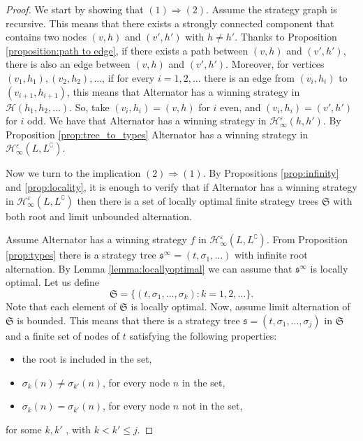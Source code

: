 \begin{proof}
We start by showing that $(1) \Rightarrow (2)$. Assume the strategy graph is recursive. This means that there exists a strongly connected component that contains two nodes $(v, h)$ and $(v', h')$ with $h \neq h'$. 
Thanks to Proposition \ref{proposition:path to edge}, if there exists a path between $(v, h)$ and $(v', h')$, there is also an edge between $(v, h)$ and $(v', h')$. 
Moreover, for vertices $(v_1,h_1),(v_2,h_2),\dots$, if for every $i=1,2,\dots$ there is an edge from $(v_i, h_i)$ to $(v_{i+1}, h_{i+1})$, this means that Alternator has a winning strategy in $\mathcal{H}(h_1,h_2,\dots)$. So, take $(v_i, h_i)= (v,h)$ for $i$ even, and $(v_i, h_i)= (v',h')$ for $i$ odd. We have that Alternator has a winning strategy in $\mathcal{H}^\varepsilon_\infty(h, h')$. By Proposition \ref{prop:tree_to_types}
Alternator has a winning strategy in  $\mathcal{H}^\varepsilon_\infty(L, L^\complement)$.


Now we turn to the implication  $(2) \Rightarrow (1)$. 
By Propositions \ref{prop:infinity}  and \ref{prop:locality}, it is enough to verify that 
 if Alternator has a winning strategy in $\mathcal{H}^\varepsilon_\infty(L, L^\complement)$ then there is a set of locally optimal finite strategy trees $\mathfrak{S}$ with both root and limit unbounded alternation. 
 
Assume Alternator has a winning strategy $f$ in  $\mathcal{H}^\varepsilon_\infty(L, L^\complement)$. From Proposition \ref{prop:types} there is a strategy tree $\mathfrak{s}^\infty = (t,\sigma_1,\dots) $ with infinite root alternation. 
 By Lemma \ref{lemma:locallyoptimal} we can assume that $\mathfrak{s}^\infty$ is  locally optimal. Let us define 
\[ \mathfrak{S}= \{ (t,\sigma_1,\dots,\sigma_k): k=1,2,\dots\}. \]
Note that each element of $\mathfrak{S}$ is locally optimal.
Now, assume limit alternation of $\mathfrak{S}$ is bounded.
This means that there is a strategy tree $\mathfrak{s}=(t, \sigma_1, \dots, \sigma_j)$ in  $ \mathfrak{S}$ and a finite set of nodes of $t$ satisfying the following properties:
\begin{itemize}
\item the root is included in the set,
\item $\sigma_k(n)\neq \sigma_{k'}(n)$, for every node $n$ in the set,
\item $\sigma_k(n)= \sigma_{k'}(n)$, for every node $n$ not in the set,
\end{itemize}
for some $k, k'$ , with $k < k' \leq j$.


\end{proof}
